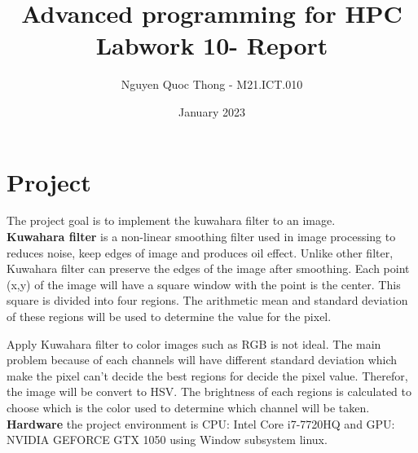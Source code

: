 \documentclass{article}
\title{Advanced programming for HPC Labwork 10- Report}
\author{Nguyen Quoc Thong - M21.ICT.010}
\date{January 2023}
\begin{document}
\maketitle

\section{Project}
The project goal is to implement the kuwahara filter to an image. \\

\textbf{Kuwahara filter} is a non-linear smoothing filter used in image processing to reduces noise, keep edges of image and produces oil effect. Unlike other filter, Kuwahara filter can preserve the edges of the image after smoothing.
Each point (x,y) of the image will have a square window with the point is the center. This square is divided into four regions. The arithmetic mean and standard deviation of these regions will be used to determine the value for the pixel. 

\begin{figure}[H]
\end{figure}

Apply Kuwahara filter to color images such as RGB is not ideal. The main problem because of each channels will have different standard deviation which make the pixel can't decide the best regions for decide the pixel value. Therefor, the image will be convert to HSV. The brightness of each regions is calculated to choose which is the color used to determine which channel will be taken.\\


\textbf{Hardware} the project environment is CPU: Intel Core i7-7720HQ and GPU: NVIDIA GEFORCE GTX 1050 using Window subsystem linux.
\end{document}
